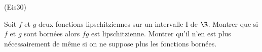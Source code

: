 \begin{tiny}(Eis30)\end{tiny}
Soit $f$ et $g$ deux fonctions lipschitziennes sur un intervalle I de $\R$. Montrer que si $f$ et $g$ sont born{\'e}es alors $fg$ est lipschitzienne. Montrer qu'il n'en est plus n{\'e}cessairement de m{\^e}me si on ne suppose plus les fonctions born{\'e}es.
